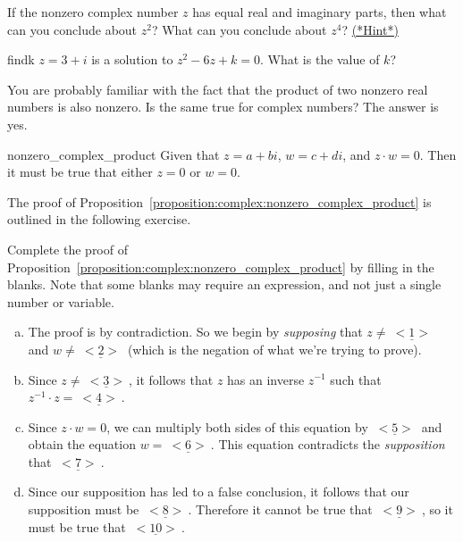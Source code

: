\begin{exercise}{10}
If the nonzero complex number $z$ has equal real and imaginary parts, then what can you conclude about $z^2$?   What can you conclude about $z^4$? 
\hyperref[sec:complex:hints]{(*Hint*)}
\end{exercise}

\begin{exercise}{findk}
$z = 3+i$ is a solution to $z^2 - 6z + k = 0$.  What is the value of $k$?
\end{exercise}


You are probably familiar with the fact that the product of two nonzero real numbers is also nonzero. Is the same true for complex numbers? The answer is yes.

\begin{prop}{nonzero_complex_product}
Given that $z = a+bi$, $w=c+di$, and $z \cdot w = 0$. Then it must be true that either $z=0$ or $w=0$.
\end{prop}
The proof of Proposition~\ref{proposition:complex:nonzero_complex_product} is outlined in the following exercise.

\begin{exercise}{12}
Complete the proof of Proposition~\ref{proposition:complex:nonzero_complex_product} by filling in the blanks. Note that some blanks may require an expression, and not just a single number or variable.

\begin{enumerate}[(a)]
\item The proof is by contradiction. So we begin by \emph{supposing} that $z \neq  \underline{~<1>~}$  and $w \neq  \underline{~<2>~}$ (which is the negation of what we're trying to prove).
\item 
Since $z \neq  \underline{~<3>~} $, it follows that $z$ has an inverse $z^{-1}$ such that $z^{-1} \cdot z =  \underline{~<4>~}$.
\item
Since $z \cdot w = 0$, we can multiply both sides of this equation by $  \underline{~<5>~}$ and obtain the equation 
$w =  \underline{~<6>~}$. This equation contradicts the \emph{supposition} that $ \underline{~<7>~}$.
\item
Since our supposition has led to a false conclusion, it follows that our supposition must be $ \underline{~<8>~}$. Therefore it cannot be true that $ \underline{~<9>~}$, so it must be true that $ \underline{~<10>~}$.
\end{enumerate}
\end{exercise}


